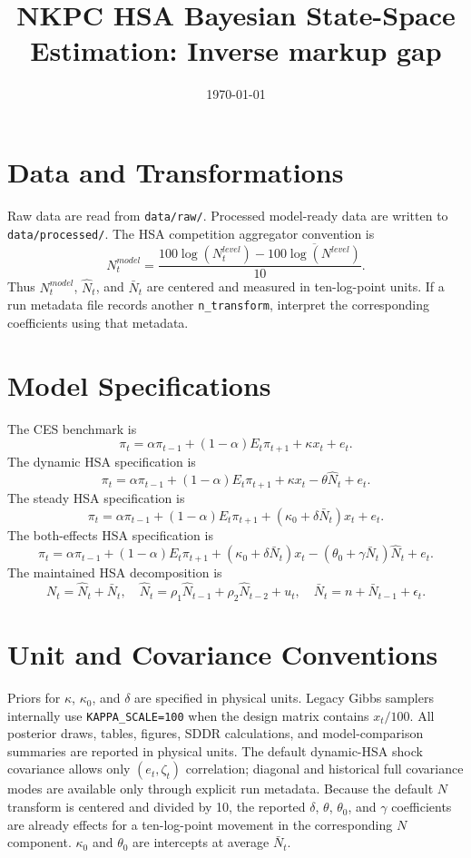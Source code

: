 \documentclass[11pt]{article}
\title{NKPC HSA Bayesian State-Space Estimation: Inverse markup gap}
\author{}
\date{\today}
\begin{document}
\maketitle

\section{Data and Transformations}
Raw data are read from \texttt{data/raw/}. Processed model-ready data are written to
\texttt{data/processed/}. The HSA competition aggregator convention is
\[
N^{model}_t=\frac{100\log(N^{level}_t)-\overline{100\log(N^{level})}}{10}.
\]
Thus \(N^{model}_t\), \(\hat N_t\), and \(\bar N_t\) are centered and measured
in ten-log-point units. If a run metadata file records another
\texttt{n\_transform}, interpret the corresponding coefficients using that
metadata.

\section{Model Specifications}
The CES benchmark is
\[
\pi_t=\alpha \pi_{t-1}+(1-\alpha)E_t\pi_{t+1}+\kappa x_t+e_t.
\]
The dynamic HSA specification is
\[
\pi_t=\alpha \pi_{t-1}+(1-\alpha)E_t\pi_{t+1}+\kappa x_t-\theta\hat N_t+e_t.
\]
The steady HSA specification is
\[
\pi_t=\alpha \pi_{t-1}+(1-\alpha)E_t\pi_{t+1}+(\kappa_0+\delta\bar N_t)x_t+e_t.
\]
The both-effects HSA specification is
\[
\pi_t=\alpha \pi_{t-1}+(1-\alpha)E_t\pi_{t+1}
+(\kappa_0+\delta\bar N_t)x_t-(\theta_0+\gamma\bar N_t)\hat N_t+e_t.
\]
The maintained HSA decomposition is
\[
N_t=\hat N_t+\bar N_t,\quad
\hat N_t=\rho_1\hat N_{t-1}+\rho_2\hat N_{t-2}+u_t,\quad
\bar N_t=n+\bar N_{t-1}+\epsilon_t.
\]

\section{Unit and Covariance Conventions}
Priors for \(\kappa\), \(\kappa_0\), and \(\delta\) are specified in
physical units. Legacy Gibbs samplers internally use \texttt{KAPPA\_SCALE=100}
when the design matrix contains \(x_t/100\). All posterior draws, tables,
figures, SDDR calculations, and model-comparison summaries are reported in
physical units. The default dynamic-HSA shock covariance allows only
\((e_t,\zeta_t)\) correlation; diagonal and historical full covariance modes
are available only through explicit run metadata.
Because the default \(N\) transform is centered and divided by 10, the reported
\(\delta\), \(\theta\), \(\theta_0\), and \(\gamma\) coefficients are already
effects for a ten-log-point movement in the corresponding \(N\) component.
\(\kappa_0\) and \(\theta_0\) are intercepts at average \(\bar N_t\).
\end{document}

